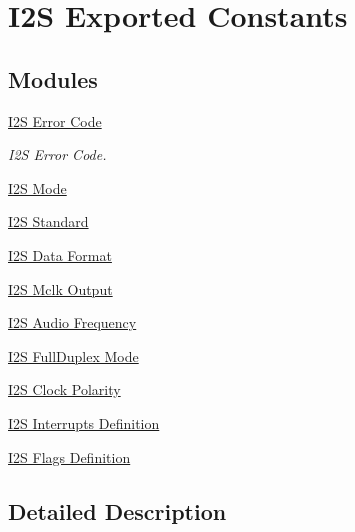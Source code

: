 \hypertarget{group___i2_s___exported___constants}{}\section{I2S Exported Constants}
\label{group___i2_s___exported___constants}
\subsection*{Modules}
\begin{DoxyCompactItemize}
\item 
\hyperlink{group___i2_s___error___code}{I2\+S Error Code}
\begin{DoxyCompactList}\small\item\em I2S Error Code. \end{DoxyCompactList}\item 
\hyperlink{group___i2_s___mode}{I2\+S Mode}
\item 
\hyperlink{group___i2_s___standard}{I2\+S Standard}
\item 
\hyperlink{group___i2_s___data___format}{I2\+S Data Format}
\item 
\hyperlink{group___i2_s___m_c_l_k___output}{I2\+S Mclk Output}
\item 
\hyperlink{group___i2_s___audio___frequency}{I2\+S Audio Frequency}
\item 
\hyperlink{group___i2_s___full_duplex___mode}{I2\+S Full\+Duplex Mode}
\item 
\hyperlink{group___i2_s___clock___polarity}{I2\+S Clock Polarity}
\item 
\hyperlink{group___i2_s___interrupts___definition}{I2\+S Interrupts Definition}
\item 
\hyperlink{group___i2_s___flags___definition}{I2\+S Flags Definition}
\end{DoxyCompactItemize}


\subsection{Detailed Description}
